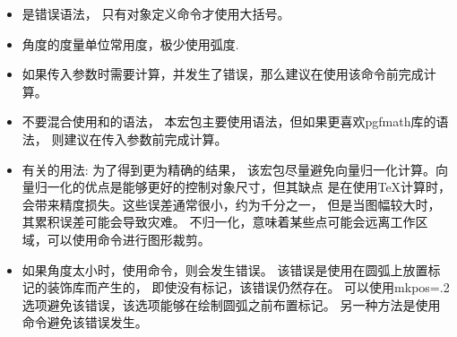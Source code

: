 \documentclass[../main.tex]{subfiles}
\begin{document}
\begin{itemize}
\item {}是错误语法，
只有对象定义命令才使用大括号。

\item 角度的度量单位常用度，极少使用弧度.
\item 如果传入参数时需要计算，并发生了错误，那么建议在使用该命令前完成计算。

\item 不要混合使用和的语法，
本宏包主要使用语法，但如果更喜欢pgfmath库的语法，
则建议在传入参数前完成计算。

\item 有关的用法: 为了得到更为精确的结果，
该宏包尽量避免向量归一化计算。向量归一化的优点是能够更好的控制对象尺寸，但其缺点
是在使用\TeX{}计算时，会带来精度损失。这些误差通常很小，约为千分之一，
但是当图幅较大时，其累积误差可能会导致灾难。
不归一化，意味着某些点可能会远离工作区域，可以使用命令进行图形裁剪。

\item 如果角度太小时，使用命令，则会发生错误。
该错误是使用在圆弧上放置标记的装饰库而产生的，
即使没有标记，该错误仍然存在。
可以使用mkpos=.2选项避免该错误，该选项能够在绘制圆弧之前布置标记。
另一种方法是使用命令避免该错误发生。

\end{itemize}
\end{document}
